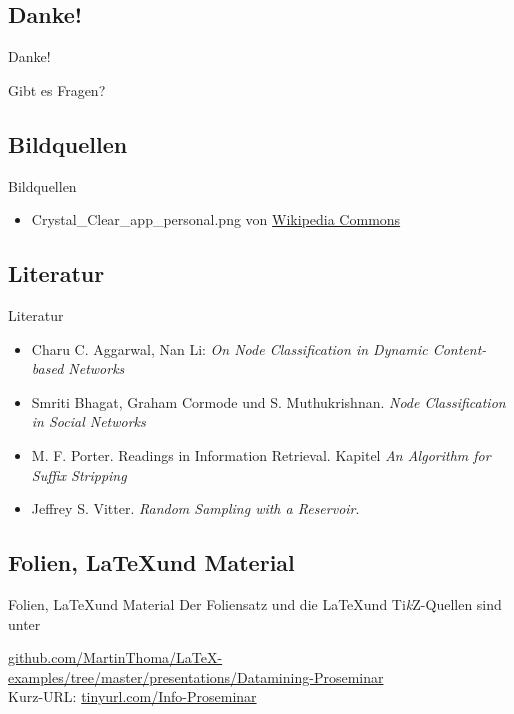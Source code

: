 \subsection{Danke!}
\begin{frame}{Danke!}
    \begin{center}
        \Huge
	    Gibt es Fragen?
    \end{center}
\end{frame}

\subsection{Bildquellen}
\begin{frame}{Bildquellen}
\begin{itemize}
	\item Crystal\_Clear\_app\_personal.png von \href{https://commons.wikimedia.org/wiki/File:Crystal_Clear_app_personal.png}{Wikipedia Commons}
\end{itemize}
\end{frame}

\subsection{Literatur}
\begin{frame}{Literatur}
\begin{itemize}
    \item Charu C. Aggarwal, Nan Li: \textit{On Node Classification in Dynamic Content-based Networks}
    \item Smriti Bhagat, Graham Cormode und S. Muthukrishnan. \textit{Node Classification in Social Networks}
    \item M. F. Porter. Readings in Information Retrieval. Kapitel \textit{An Algorithm for Suffix Stripping}
    \item Jeffrey S. Vitter. \textit{Random Sampling with a Reservoir}.
\end{itemize}
\end{frame}

\subsection{Folien, \LaTeX und Material}
\begin{frame}{Folien, \LaTeX und Material}
Der Foliensatz und die \LaTeX und Ti\textit{k}Z-Quellen sind unter

\href{https://github.com/MartinThoma/LaTeX-examples/tree/master/presentations/Datamining-Proseminar}{github.com/MartinThoma/LaTeX-examples/tree/master/presentations/Datamining-Proseminar}
\\

Kurz-URL:
\href{http://tinyurl.com/Info-Proseminar}{tinyurl.com/Info-Proseminar}
\end{frame}

